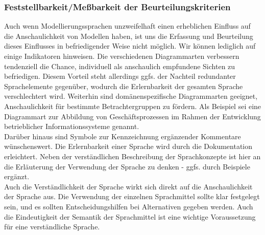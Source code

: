 \subsubsection{Feststellbarkeit/Meßbarkeit der Beurteilungskriterien} 
Auch wenn Modellierungssprachen unzweifelhaft einen erheblichen Einfluss auf die Anschaulichkeit
von Modellen haben, ist uns die Erfassung und Beurteilung dieses Einflusses in befriedigender Weise
nicht möglich. Wir können lediglich auf einige Indikatoren hinweisen. Die verschiedenen Diagrammarten
verbessern tendenziell die Chance, individuell als anschaulich empfundene Sichten zu befriedigen.
Diesem Vorteil steht allerdings ggfs. der Nachteil redundanter Sprachelemente gegenüber,
wodurch die Erlernbarkeit der gesamten Sprache verschlechtert wird. Weiterhin sind domänenspezifische
Diagrammarten geeignet, Anschaulichkeit für bestimmte Betrachtergruppen zu fördern. Als Beispiel
sei eine Diagrammart zur Abbildung von Geschäftsprozessen im Rahmen der Entwicklung
betrieblicher Informationssysteme genannt.
\\
Darüber hinaus sind Symbole zur Kennzeichnung ergänzender Kommentare wünschenswert. Die
Erlernbarkeit einer Sprache wird durch die Dokumentation erleichtert. Neben der verständlichen
Beschreibung der Sprachkonzepte ist hier an die Erläuterung der Verwendung der Sprache zu denken -
ggfs. durch Beispiele ergänzt.\\
Auch die Verständlichkeit der Sprache wirkt sich direkt auf die Anschaulichkeit der Sprache aus. Die
Verwendung der einzelnen Sprachmittel sollte klar festgelegt sein, und es sollten Entscheidungshilfen
bei Alternativen gegeben werden. Auch die Eindeutigkeit der Semantik der Sprachmittel ist eine wichtige
Voraussetzung für eine verständliche Sprache.\\


